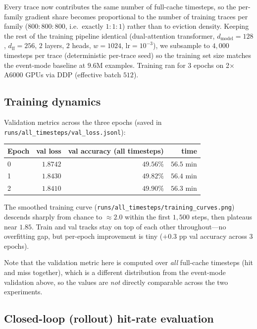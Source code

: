 \documentclass{article}
\begin{document}
Every trace now contributes the same number of full-cache timesteps, so the
per-family gradient share becomes proportional to the number of training
traces per family ($800{:}800{:}800$, i.e.\ exactly $1{:}1{:}1$) rather than
to eviction density. Keeping the rest of the training pipeline identical
(dual-attention transformer, $d_{\text{model}}{=}128$, $d_{\text{ff}}{=}256$,
$2$ layers, $2$ heads, $w{=}1024$, $\mathrm{lr}{=}10^{-3}$), we subsample to
$4{,}000$ timesteps per trace (deterministic per-trace seed) so the training
set size matches the event-mode baseline at $9.6$M examples. Training ran
for $3$ epochs on 2${\times}$A6000 GPUs via DDP (effective batch $512$).

\subsection{Training dynamics}

Validation metrics across the three epochs (saved in
\texttt{runs/all\_timesteps/val\_loss.jsonl}):

\begin{center}
\begin{tabular}{lrrr}
\toprule
Epoch & val loss & val accuracy (all timesteps) & time \\
\midrule
0 & $1.8742$ & $49.56\%$ & $56.5$ min \\
1 & $1.8430$ & $49.82\%$ & $56.4$ min \\
2 & $1.8410$ & $49.90\%$ & $56.3$ min \\
\bottomrule
\end{tabular}
\end{center}

The smoothed training curve (\texttt{runs/all\_timesteps/training\_curves.png})
descends sharply from chance to $\approx\!2.0$ within the first $1{,}500$
steps, then plateaus near $1.85$. Train and val tracks stay on top of each
other throughout---no overfitting gap, but per-epoch improvement is tiny
($+0.3$ pp val accuracy across $3$ epochs).

Note that the validation metric here is computed over \emph{all} full-cache
timesteps (hit and miss together), which is a different distribution from
the event-mode validation above, so the values are \emph{not} directly
comparable across the two experiments.

\subsection{Closed-loop (rollout) hit-rate evaluation}
\end{document}
